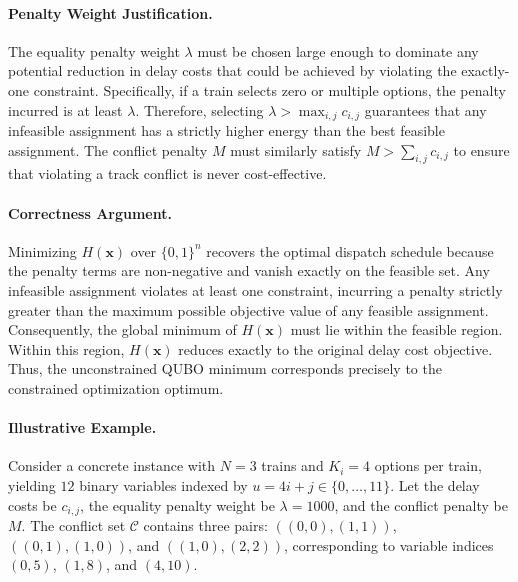 \documentclass[12pt]{article}
\begin{document}
\paragraph{Penalty Weight Justification.}
The equality penalty weight $\lambda$ must be chosen large enough to dominate any potential reduction in delay costs that could be achieved by violating the exactly-one constraint. Specifically, if a train selects zero or multiple options, the penalty incurred is at least $\lambda$. Therefore, selecting $\lambda > \max_{i,j} c_{i,j}$ guarantees that any infeasible assignment has a strictly higher energy than the best feasible assignment. The conflict penalty $M$ must similarly satisfy $M > \sum_{i,j} c_{i,j}$ to ensure that violating a track conflict is never cost-effective.

\paragraph{Correctness Argument.}
Minimizing $H(\mathbf{x})$ over $\{0,1\}^n$ recovers the optimal dispatch schedule because the penalty terms are non-negative and vanish exactly on the feasible set. Any infeasible assignment violates at least one constraint, incurring a penalty strictly greater than the maximum possible objective value of any feasible assignment. Consequently, the global minimum of $H(\mathbf{x})$ must lie within the feasible region. Within this region, $H(\mathbf{x})$ reduces exactly to the original delay cost objective. Thus, the unconstrained QUBO minimum corresponds precisely to the constrained optimization optimum.

\paragraph{Illustrative Example.}
Consider a concrete instance with $N=3$ trains and $K_i=4$ options per train, yielding $12$ binary variables indexed by $u = 4i + j \in \{0, \dots, 11\}$. Let the delay costs be $c_{i,j}$, the equality penalty weight be $\lambda = 1000$, and the conflict penalty be $M$. The conflict set $\mathcal{C}$ contains three pairs: $((0,0),(1,1))$, $((0,1),(1,0))$, and $((1,0),(2,2))$, corresponding to variable indices $(0,5)$, $(1,8)$, and $(4,10)$.
\end{document}
